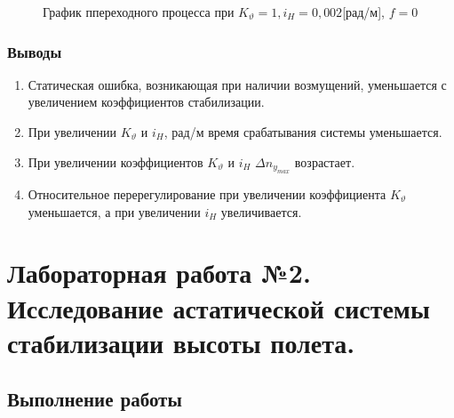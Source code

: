 \documentclass[a4paper,12pt]{article}
\begin{document}
    \begin{figure}[H]
        \caption{График ппереходного процесса при $K_{\vartheta}=1, i_H=0,002$[рад/м], $f=0$}
        \label{fig:Переходный процесс 2}
    \end{figure}

    \subsubsection{Выводы}
    \begin{enumerate}
        \item Статическая ошибка, возникающая при наличии возмущений, уменьшается с увеличением коэффициентов стабилизации.
        \item При увеличении $K_{\vartheta}$  и $i_H$, рад/м время срабатывания системы уменьшается.
        \item При увеличении коэффициентов $K_{\vartheta}$  и $i_H$ $\Delta n_{y_{max}}$ возрастает. 
        \item Относительное перерегулирование при увеличении коэффициента $K_{\vartheta}$ уменьшается, а при увеличении $i_H$ увеличивается.
    \end{enumerate}

\section{Лабораторная работа №2. Исследование астатической системы стабилизации высоты полета.}
    \subsection{Выполнение работы}
\end{document}

